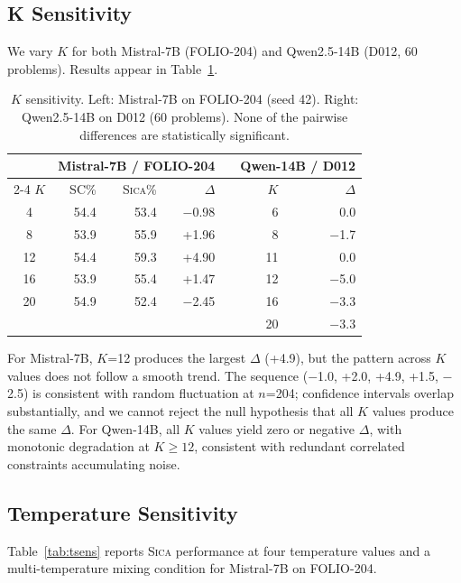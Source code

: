 \documentclass[11pt,a4paper]{article}
\newcommand{\sica}{\textsc{Sica}}
\newcommand{\pp}{\text{pp}}
\begin{document}
\subsection{K Sensitivity}

We vary $K$ for both Mistral-7B (FOLIO-204) and Qwen2.5-14B (D012, 60 problems). Results appear in Table~\ref{tab:ksens}.

\begin{table}[t]
\centering
\caption{$K$ sensitivity. Left: Mistral-7B on FOLIO-204 (seed 42). Right: Qwen2.5-14B on D012 (60 problems). None of the pairwise differences are statistically significant.}
\label{tab:ksens}
\small
\begin{tabular}{crrrcrr}
\toprule
& \multicolumn{3}{c}{Mistral-7B / FOLIO-204} & & \multicolumn{2}{c}{Qwen-14B / D012} \\
\cmidrule{2-4} \cmidrule{6-7}
$K$ & SC\% & \sica{}\% & $\Delta$\pp{} & & $K$ & $\Delta$\pp{} \\
\midrule
4 & 54.4 & 53.4 & $-$0.98 & & 6 & 0.0 \\
8 & 53.9 & 55.9 & +1.96 & & 8 & $-$1.7 \\
12 & 54.4 & 59.3 & +4.90 & & 11 & 0.0 \\
16 & 53.9 & 55.4 & +1.47 & & 12 & $-$5.0 \\
20 & 54.9 & 52.4 & $-$2.45 & & 16 & $-$3.3 \\
 & & & & & 20 & $-$3.3 \\
\bottomrule
\end{tabular}
\end{table}

For Mistral-7B, $K$=12 produces the largest $\Delta$ (+4.9\pp{}), but the pattern across $K$ values does not follow a smooth trend.
The sequence ($-$1.0, +2.0, +4.9, +1.5, $-$2.5) is consistent with random fluctuation at $n$=204; confidence intervals overlap substantially, and we cannot reject the null hypothesis that all $K$ values produce the same $\Delta$.
For Qwen-14B, all $K$ values yield zero or negative $\Delta$, with monotonic degradation at $K \geq 12$, consistent with redundant correlated constraints accumulating noise.

\subsection{Temperature Sensitivity}

Table~\ref{tab:tsens} reports \sica{} performance at four temperature values and a multi-temperature mixing condition for Mistral-7B on FOLIO-204.
\end{document}
